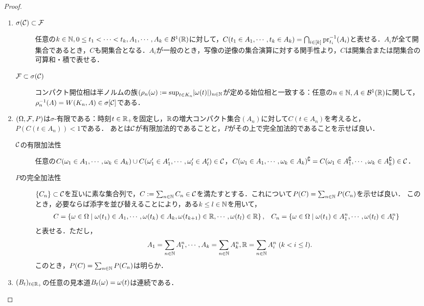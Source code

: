 \documentclass[uplatex,dvipdfmx]{jsreport}
\begin{document}
\begin{proof}\mbox{}
    \begin{enumerate}
        \item \begin{description}
            \item[$\sigma(\mathcal{C})\subset\mathcal{F}$] 任意の$k\in\mathbb{N},0\le t_1<\cdots<t_k,A_1,\cdots,A_k\in\mathcal{B}^1(\mathbb{R})$に対して，$C(t_1\in A_1,\cdots,t_k\in A_k)=\bigcap_{i\in[k]}\mathrm{pr}_{t_i}^{-1}(A_i)$と表せる．$A_i$が全て開集合であるとき，$C$も開集合となる．$A_i$が一般のとき，写像の逆像の集合演算に対する関手性より，$C$は開集合または閉集合の可算和・積で表せる．
            \item[$\mathcal{F}\subset\sigma(\mathcal{C})$] コンパクト開位相は半ノルムの族$(\rho_n(\omega):=\sup_{t\in K_n}\lvert\omega(t)\rvert)_{n\in\mathbb{N}}$が定める始位相と一致する：任意の$n\in\mathbb{N},A\in\mathcal{B}^1(\mathbb{R})$に関して，$\rho_n^{-1}(A)=W(K_n,A)\in\sigma[\mathcal{C}]$である．
        \end{description}
        \item 
        $(\Omega,\mathcal{F},P)$は$\sigma$-有限である：時刻$t\in\mathbb{R}_+$を固定し，$\mathbb{R}$の増大コンパクト集合$(A_n)$に対して$C(t\in A_n)$を考えると，$P(C(t\in A_n))<1$である．
        あとは$\mathcal{C}$が有限加法的であることと，$P$がその上で完全加法的であることを示せば良い．
        \begin{description}
            \item[$\mathcal{C}$の有限加法性] 任意の$C(\omega_1\in A_1,\cdots,\omega_k\in A_k)\cup C(\omega'_1\in A'_1,\cdots,\omega'_l\in A'_l)\in\mathcal{C}$，$C(\omega_1\in A_1,\cdots,\omega_k\in A_k)^\complement=C(\omega_1\in A_1^\complement,\cdots,\omega_k\in A_k^\complement)\in\mathcal{C}$．
            \item[$P$の完全加法性] $\{C_n\}\subset\mathcal{C}$を互いに素な集合列で，$C:=\sum_{n\in\mathbb{N}}C_n\in\mathcal{C}$を満たすとする．これについて$P(C)=\sum_{n\in\mathbb{N}}P(C_n)$を示せば良い．
            このとき，必要ならば添字を並び替えることにより，ある$k\le l\in\mathbb{N}$を用いて，
            \begin{align*}
                C&=\left\{\omega\in\Omega\mid\omega(t_1)\in A_1,\cdots,\omega(t_k)\in A_k,\omega(t_{k+1})\in\mathbb{R},\cdots,\omega(t_l)\in\mathbb{R}\right\},&
                C_n&=\left\{\omega\in\Omega\mid\omega(t_1)\in A_1^n,\cdots,\omega(t_l)\in A_l^n\right\}
            \end{align*}
            と表せる．ただし，
            \[A_1=\sum_{n\in\mathbb{N}}A_1^n,\cdots,A_k=\sum_{n\in\mathbb{N}}A_k^n,\mathbb{R}=\sum_{n\in\mathbb{N}}A_i^n\;(k<i\le l).\]
            このとき，$P(C)=\sum_{n\in\mathbb{N}}P(C_n)$は明らか．
        \end{description}
        \item $(B_t)_{t\in\mathbb{R}_+}$の任意の見本道$B_t(\omega)=\omega(t)$は連続である．

\end{enumerate}
\end{proof}
\end{document}
